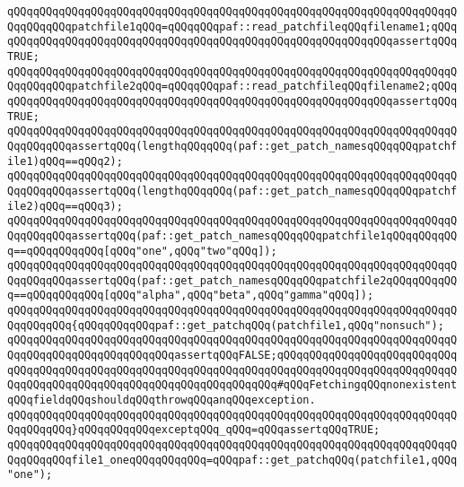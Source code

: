 \newline
\newline
\verb|qQQqqQQqqQQqqQQqqQQqqQQqqQQqqQQqqQQqqQQqqQQqqQQqqQQqqQQqqQQqqQQqqQQqqQQqqQQqqQQqpatchfile1qQQq=qQQqqQQqpaf::read_patchfileqQQqfilename1;qQQqqQQqqQQqqQQqqQQqqQQqqQQqqQQqqQQqqQQqqQQqqQQqqQQqqQQqqQQqqQQqassertqQQqTRUE;|\newline
\verb|qQQqqQQqqQQqqQQqqQQqqQQqqQQqqQQqqQQqqQQqqQQqqQQqqQQqqQQqqQQqqQQqqQQqqQQqqQQqqQQqpatchfile2qQQq=qQQqqQQqpaf::read_patchfileqQQqfilename2;qQQqqQQqqQQqqQQqqQQqqQQqqQQqqQQqqQQqqQQqqQQqqQQqqQQqqQQqqQQqqQQqassertqQQqTRUE;|\newline
\newline
\verb|qQQqqQQqqQQqqQQqqQQqqQQqqQQqqQQqqQQqqQQqqQQqqQQqqQQqqQQqqQQqqQQqqQQqqQQqqQQqqQQqassertqQQq(lengthqQQqqQQq(paf::get_patch_namesqQQqqQQqpatchfile1)qQQq==qQQq2);|\newline
\verb|qQQqqQQqqQQqqQQqqQQqqQQqqQQqqQQqqQQqqQQqqQQqqQQqqQQqqQQqqQQqqQQqqQQqqQQqqQQqqQQqassertqQQq(lengthqQQqqQQq(paf::get_patch_namesqQQqqQQqpatchfile2)qQQq==qQQq3);|\newline
\newline
\verb|qQQqqQQqqQQqqQQqqQQqqQQqqQQqqQQqqQQqqQQqqQQqqQQqqQQqqQQqqQQqqQQqqQQqqQQqqQQqqQQqassertqQQq(paf::get_patch_namesqQQqqQQqpatchfile1qQQqqQQqqQQq==qQQqqQQqqQQq[qQQq"one",qQQq"two"qQQq]);|\newline
\verb|qQQqqQQqqQQqqQQqqQQqqQQqqQQqqQQqqQQqqQQqqQQqqQQqqQQqqQQqqQQqqQQqqQQqqQQqqQQqqQQqassertqQQq(paf::get_patch_namesqQQqqQQqpatchfile2qQQqqQQqqQQq==qQQqqQQqqQQq[qQQq"alpha",qQQq"beta",qQQq"gamma"qQQq]);|\newline
\newline
\verb|qQQqqQQqqQQqqQQqqQQqqQQqqQQqqQQqqQQqqQQqqQQqqQQqqQQqqQQqqQQqqQQqqQQqqQQqqQQqqQQq{qQQqqQQqqQQqpaf::get_patchqQQq(patchfile1,qQQq"nonsuch");|\newline
\verb|qQQqqQQqqQQqqQQqqQQqqQQqqQQqqQQqqQQqqQQqqQQqqQQqqQQqqQQqqQQqqQQqqQQqqQQqqQQqqQQqqQQqqQQqqQQqqQQqassertqQQqFALSE;qQQqqQQqqQQqqQQqqQQqqQQqqQQqqQQqqQQqqQQqqQQqqQQqqQQqqQQqqQQqqQQqqQQqqQQqqQQqqQQqqQQqqQQqqQQqqQQqqQQqqQQqqQQqqQQqqQQqqQQqqQQqqQQqqQQqqQQqqQQq#qQQqFetchingqQQqnonexistentqQQqfieldqQQqshouldqQQqthrowqQQqanqQQqexception.|\newline
\verb|qQQqqQQqqQQqqQQqqQQqqQQqqQQqqQQqqQQqqQQqqQQqqQQqqQQqqQQqqQQqqQQqqQQqqQQqqQQqqQQq}qQQqqQQqqQQqexceptqQQq_qQQq=qQQqassertqQQqTRUE;|\newline
\newline
\verb|qQQqqQQqqQQqqQQqqQQqqQQqqQQqqQQqqQQqqQQqqQQqqQQqqQQqqQQqqQQqqQQqqQQqqQQqqQQqqQQqfile1_oneqQQqqQQqqQQq=qQQqpaf::get_patchqQQq(patchfile1,qQQq"one");|\newline
